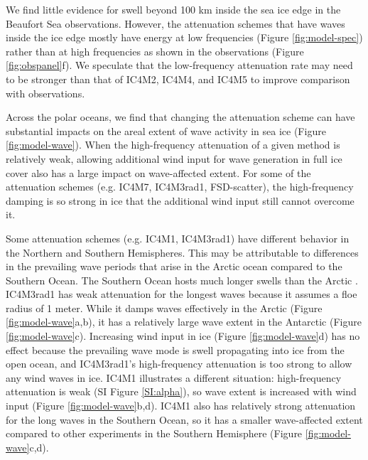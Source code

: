 \documentclass [11pt, proquest] {uwthesis}[2020/02/24]
\begin{document}

We find little evidence for swell beyond 100 km inside the sea ice edge in the Beaufort Sea observations. However, the attenuation schemes that have waves inside the ice edge mostly have energy at low frequencies (Figure \ref{fig:model-spec}) rather than at high frequencies as shown in the observations (Figure \ref{fig:obspanel}f). We speculate that the low-frequency attenuation rate may need to be stronger than that of IC4M2, IC4M4, and IC4M5 to improve comparison with observations.  

Across the polar oceans, we find that changing the attenuation scheme can have substantial impacts on the areal extent of wave activity in sea ice (Figure \ref{fig:model-wave}). When the high-frequency attenuation of a given method is relatively weak, allowing additional wind input for wave generation in full ice cover also has a large impact on wave-affected extent. For some of the attenuation schemes (e.g. IC4M7, IC4M3rad1, FSD-scatter), the high-frequency damping is so strong in ice that the additional wind input still cannot overcome it.

Some attenuation schemes (e.g. IC4M1, IC4M3rad1) have different behavior in the Northern and Southern Hemispheres. This may be attributable to differences in the prevailing wave periods that arise in the Arctic ocean compared to the Southern Ocean. The Southern Ocean hosts much longer swells than the Arctic \cite{Liu2016WindAltimeters, Young2020TheOcean}. IC4M3rad1 has weak attenuation for the longest waves because it assumes a floe radius of 1 meter. While it damps waves effectively in the Arctic (Figure \ref{fig:model-wave}a,b), it has a relatively large wave extent in the Antarctic (Figure \ref{fig:model-wave}c). Increasing wind input in ice (Figure \ref{fig:model-wave}d) has no effect because the prevailing wave mode is swell propagating into ice from the open ocean, and IC4M3rad1's high-frequency attenuation is too strong to allow any wind waves in ice. IC4M1 illustrates a different situation: high-frequency attenuation is weak (SI Figure \ref{SI:alpha}), so wave extent is increased with wind input (Figure \ref{fig:model-wave}b,d). IC4M1 also has relatively strong attenuation for the long waves in the Southern Ocean, so it has a smaller wave-affected extent compared to other experiments in the Southern Hemisphere (Figure \ref{fig:model-wave}c,d).  
\end{document}

